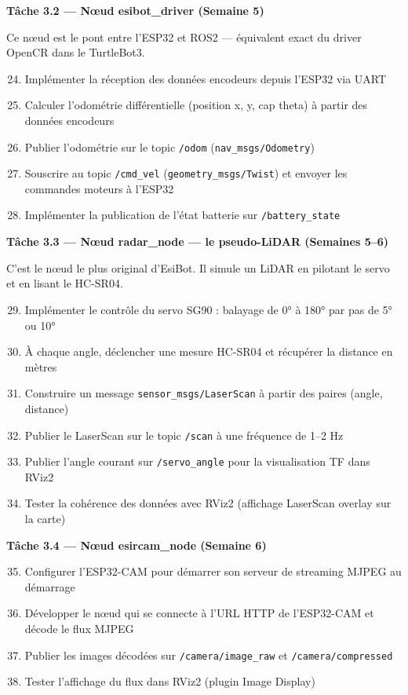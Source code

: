 \documentclass[12pt,a4paper]{article}
\begin{document}
\textbf{Tâche 3.2 — Nœud esibot\_driver (Semaine 5)}

Ce nœud est le pont entre l'ESP32 et ROS2 — équivalent exact du driver OpenCR dans le TurtleBot3.

\begin{enumerate}
  \setcounter{enumi}{23}
  \item Implémenter la réception des données encodeurs depuis l'ESP32 via UART
  \item Calculer l'odométrie différentielle (position x, y, cap theta) à partir des données encodeurs
  \item Publier l'odométrie sur le topic \texttt{/odom} (\texttt{nav\_msgs/Odometry})
  \item Souscrire au topic \texttt{/cmd\_vel} (\texttt{geometry\_msgs/Twist}) et envoyer les commandes moteurs à l'ESP32
  \item Implémenter la publication de l'état batterie sur \texttt{/battery\_state}
\end{enumerate}

\textbf{Tâche 3.3 — Nœud radar\_node — le pseudo-LiDAR (Semaines 5–6)}

C'est le nœud le plus original d'EsiBot. Il simule un LiDAR en pilotant le servo et en lisant le HC-SR04.

\begin{enumerate}
  \setcounter{enumi}{28}
  \item Implémenter le contrôle du servo SG90 : balayage de 0° à 180° par pas de 5° ou 10°
  \item À chaque angle, déclencher une mesure HC-SR04 et récupérer la distance en mètres
  \item Construire un message \texttt{sensor\_msgs/LaserScan} à partir des paires (angle, distance)
  \item Publier le LaserScan sur le topic \texttt{/scan} à une fréquence de 1–2 Hz
  \item Publier l'angle courant sur \texttt{/servo\_angle} pour la visualisation TF dans RViz2
  \item Tester la cohérence des données avec RViz2 (affichage LaserScan overlay sur la carte)
\end{enumerate}

\textbf{Tâche 3.4 — Nœud esircam\_node (Semaine 6)}

\begin{enumerate}
  \setcounter{enumi}{34}
  \item Configurer l'ESP32-CAM pour démarrer son serveur de streaming MJPEG au démarrage
  \item Développer le nœud qui se connecte à l'URL HTTP de l'ESP32-CAM et décode le flux MJPEG
  \item Publier les images décodées sur \texttt{/camera/image\_raw} et \texttt{/camera/compressed}
  \item Tester l'affichage du flux dans RViz2 (plugin Image Display)
\end{enumerate}
\end{document}
